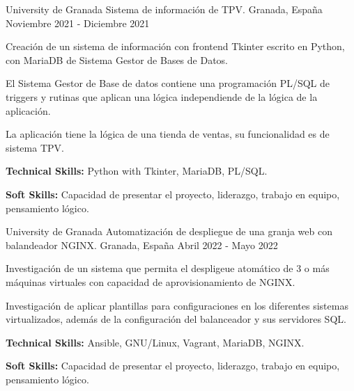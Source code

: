 

\begin{cventries}

  \cventry
    {University de Granada} %
    {Sistema de información de TPV.} %
    {Granada, España} %
    {Noviembre 2021 - Diciembre 2021} %
    {
      \begin{cvitems} %
        \item {Creación de un sistema de información con frontend Tkinter escrito en Python, con MariaDB de Sistema Gestor de Bases de Datos.}
        \item {El Sistema Gestor de Base de datos contiene una programación PL/SQL de triggers y rutinas que aplican una lógica independiende de la lógica de la aplicación.}
        \item {La aplicación tiene la lógica de una tienda de ventas, su funcionalidad es de sistema TPV.}
        \item {\textbf{Technical Skills:} Python with Tkinter, MariaDB, PL/SQL.}
        \item {\textbf{Soft Skills:} Capacidad de presentar el proyecto, liderazgo, trabajo en equipo, pensamiento lógico.}
      \end{cvitems}
    }
\cventry
  {University de Granada} %
  {Automatización de despliegue de una granja web con balandeador NGINX.} %
  {Granada, España} %
  {Abril 2022 - Mayo 2022} %
  {
    \begin{cvitems} %
      \item {Investigación de un sistema que permita el despligeue atomático de 3 o más máquinas virtuales con capacidad de aprovisionamiento de NGINX.}
      \item {Investigación de aplicar plantillas para configuraciones en los diferentes sistemas virtualizados, además de la configuración del balanceador y sus servidores SQL.}
      \item {\textbf{Technical Skills:} Ansible, GNU/Linux, Vagrant, MariaDB, NGINX.}
      \item {\textbf{Soft Skills:} Capacidad de presentar el proyecto, liderazgo, trabajo en equipo, pensamiento lógico.}
    \end{cvitems}
  }


\end{cventries}
